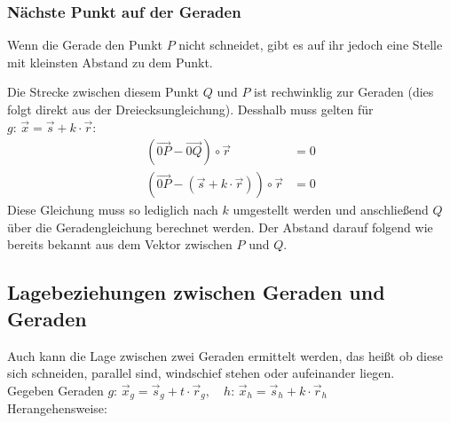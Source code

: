 \documentclass[a4paper,12pt]{article}
\begin{document}
	\subsubsection{Nächste Punkt auf der Geraden}
	Wenn die Gerade den Punkt $P$ nicht schneidet, gibt es auf ihr jedoch eine Stelle mit kleinsten Abstand zu dem Punkt.
	\begin{center}
	\end{center}
	Die Strecke zwischen diesem Punkt $Q$ und $P$ ist rechwinklig zur Geraden (dies folgt direkt aus der Dreiecksungleichung). Desshalb muss gelten für $g: \, \vec{x}= \vec{s} + k\cdot \vec{r}$:
		\begin{align*}
			(\vec{0P} - \vec{0Q})\circ \vec{r} &= 0\\
			(\vec{0P} - (\vec{s} + k\cdot \vec{r}))\circ \vec{r} &= 0
		\end{align*}
	Diese Gleichung muss so lediglich nach $k$ umgestellt werden und anschließend $Q$ über die Geradengleichung berechnet werden. Der Abstand darauf folgend wie bereits bekannt aus dem Vektor zwischen $P$ und  $Q$.
	\subsection{Lagebeziehungen zwischen Geraden und Geraden}
	Auch kann die Lage zwischen zwei Geraden ermittelt werden, das heißt ob diese sich schneiden, parallel sind, windschief stehen oder aufeinander liegen.\\
	Gegeben Geraden $g:\, \vec{x}_g = \vec{s}_g + t\cdot \vec{r}_g,\quad h:\, \vec{x}_h = \vec{s}_h + k\cdot \vec{r}_h$\\
	Herangehensweise:
\end{document}
